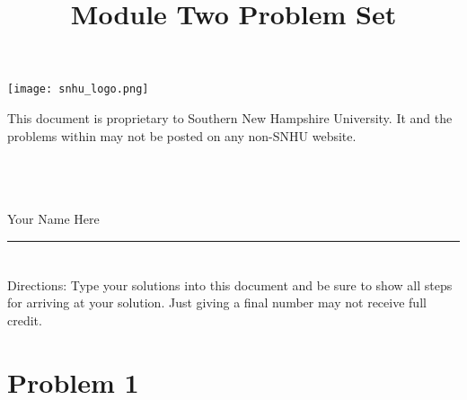 \documentclass{amsart}
\theoremstyle{definition}
\theoremstyle{Exercise}
\theoremstyle{remark}
\theoremstyle{rule}
\numberwithin{equation}{section}
\begin{document}
\title{\sf Module Two Problem Set}

\begin{center}
\texttt{[image: snhu\_logo.png]}
\end{center}

\maketitle
This document is proprietary to Southern New Hampshire University. It and the problems within may not be posted on any non-SNHU website.\\\\\\\\
\begin{center}
Your Name Here
\end{center}


\begin{center}
\rule{\textwidth}{0.4pt}
\end{center}


\newpage


\newpage

\section*{}
\section*{}

Directions: Type your solutions into this document and be sure to show all steps for arriving at your solution. Just giving a final number may not receive full credit.\\

\section*{Problem 1}
\end{document}
